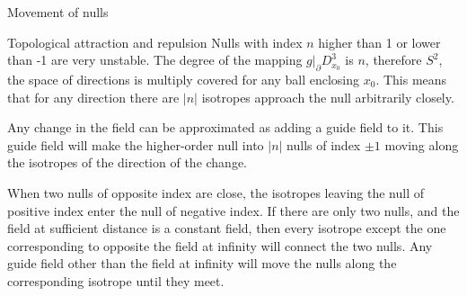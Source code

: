 \documentclass[final]{beamer}
\newlength{\onecolwid}
\begin{document}
\begin{frame}[t]
\begin{columns}[t]
\begin{column}{\onecolwid}
\begin{block}{Movement of nulls}
\end{block}


\begin{block}{Topological attraction and repulsion}
    Nulls with index $n$ higher than 1 or lower than -1 are very unstable.  The degree of
    the mapping $g|_\partial D^3_{x_0}$ is $n$, therefore $S^2$, the space of
    directions is multiply covered for any ball enclosing $x_0$. 
    This means that for any direction there are $|n|$ isotropes approach the null arbitrarily
    closely. 

    Any change in the field can be approximated as 
    adding a guide field to it. 
    This guide field will make the higher-order null into $|n|$ nulls of index $\pm 1$ moving along the
    isotropes of the direction of the change. 

    When two nulls of opposite index are close, the isotropes leaving the null of positive
    index enter the null of negative index. 
    If there are only two nulls, and the field at sufficient distance is a constant field,
    then every isotrope except the one corresponding to opposite the field at infinity
    will connect the two nulls. 
    Any guide field other than the field at infinity will move the nulls along the
    corresponding isotrope until they meet. 
\end{block}




\end{column}
\end{columns}
\end{frame}
\end{document}
